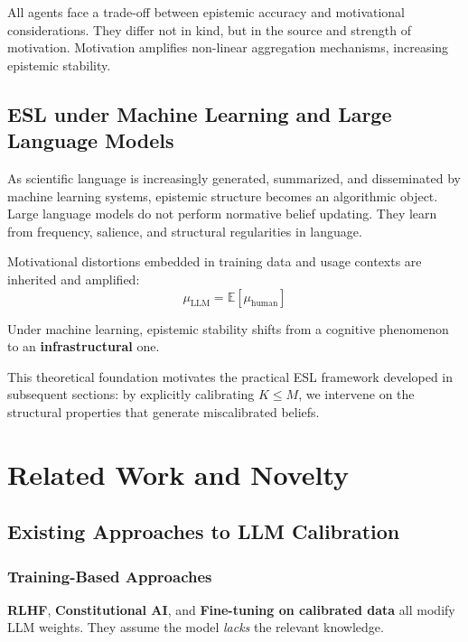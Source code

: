 \documentclass[11pt,a4paper]{article}
\begin{document}
All agents face a trade-off between epistemic accuracy and motivational considerations. They differ not in kind, but in the source and strength of motivation. Motivation amplifies non-linear aggregation mechanisms, increasing epistemic stability.


\subsection{ESL under Machine Learning and Large Language Models}

As scientific language is increasingly generated, summarized, and disseminated by machine learning systems, epistemic structure becomes an algorithmic object. Large language models do not perform normative belief updating. They learn from frequency, salience, and structural regularities in language.

\begin{principlebox}
Motivational distortions embedded in training data and usage contexts are inherited and amplified:
\begin{equation}
\mu_{\text{LLM}} = \mathbb{E}[\mu_{\text{human}}]
\end{equation}

Under machine learning, epistemic stability shifts from a cognitive phenomenon to an \textbf{infrastructural} one.
\end{principlebox}

This theoretical foundation motivates the practical ESL framework developed in subsequent sections: by explicitly calibrating $K \leq M$, we intervene on the structural properties that generate miscalibrated beliefs.



\section{Related Work and Novelty}

\subsection{Existing Approaches to LLM Calibration}

\subsubsection{Training-Based Approaches}
\textbf{RLHF}, \textbf{Constitutional AI}, and \textbf{Fine-tuning on calibrated data} all modify LLM weights. They assume the model \emph{lacks} the relevant knowledge.
\end{document}

